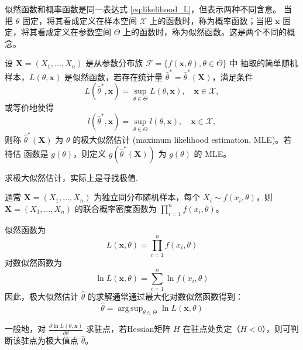 \begin{remark}
    似然函数和概率函数是同一表达式 \eqref{eq:likelihood_L}，但表示两种不同含意。
当把 $\theta$ 固定，将其看成定义在样本空间 $\mathcal{X}$ 上的函数时，称为概率函数；当把 $\mathbf{x}$ 固
定，将其看成定义在参数空间 $\Theta$ 上的函数时，称为似然函数。这是两个不同的概念。
\end{remark}

\begin{definition}[极大似然估计]\label{def:MLE}
设 $\mathbf{X} = (X_1, \dots, X_n)$ 是从参数分布族 $\mathcal{F} = \{f(\mathbf{x}, \theta), \theta \in \Theta\}$ 中
抽取的简单随机样本，$L(\theta, \mathbf{x})$ 是似然函数，若存在统计量 $\hat{\theta}^* = \hat{\theta}^*(\mathbf{X})$，满足条件
\begin{equation}
L(\hat{\theta}^*, \mathbf{x}) = \sup_{\theta \in \Theta} L(\theta, \mathbf{x}), \quad \mathbf{x} \in \mathcal{X}, \label{eq:MLE_L}
\end{equation}
或等价地使得
\begin{equation}
l(\hat{\theta}^*, \mathbf{x}) = \sup_{\theta \in \Theta} l(\theta, \mathbf{x}), \quad \mathbf{x} \in \mathcal{X}, \label{eq:MLE_l}
\end{equation}
则称 $\hat{\theta}^*(\mathbf{X})$ 为 $\theta$ 的极大似然估计 (maximum likelihood estimation, MLE)。若待估
函数是 $g(\theta)$，则定义 $g(\hat{\theta}^*(\mathbf{X}))$ 为 $g(\theta)$ 的 MLE。
\end{definition}

\begin{remark}
    求极大似然估计，实际上是寻找极值.

通常 $\mathbf{X} = (X_1, \dots, X_n)$ 为独立同分布随机样本，每个 $X_i \sim f(x_i, \theta)$，则 $\mathbf{X} = (X_1, \dots, X_n)$ 的联合概率密度函数为 $\prod_{i=1}^n f(x_i, \theta)$。

似然函数为
$$L(\mathbf{x}, \theta) = \prod_{i=1}^n f(x_i, \theta)$$
对数似然函数为
$$\ln L(\mathbf{x}, \theta) = \sum_{i=1}^n \ln f(x_i, \theta)$$
因此，极大似然估计 $\hat{\theta}$ 的求解通常通过最大化对数似然函数得到：
$$\hat{\theta} = \operatorname{arg\,sup}_{\theta \in \Theta} \ln L(\mathbf{x}, \theta)$$

一般地，对 $\frac{\partial \ln L(\theta, \mathbf{x})}{\partial \theta}$ 求驻点，若Hessian矩阵 $H$ 在驻点处负定（$H < 0$），则可判断该驻点为极大值点 $\hat{\theta}$。
\end{remark}

